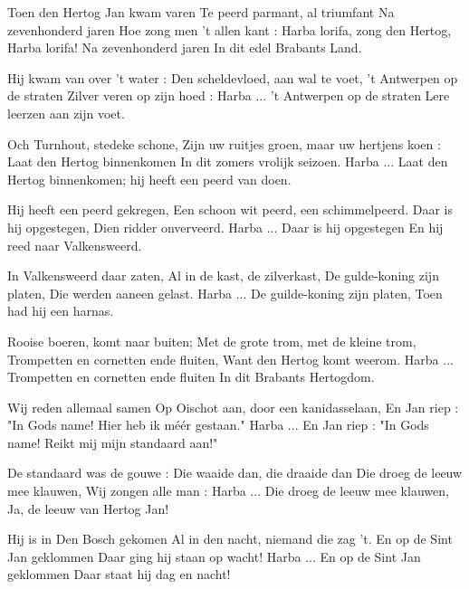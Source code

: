 \footnotemark [
ititle={Lied van Hertog Jan, het}]


\beginverse
Toen den Hertog Jan kwam varen
Te peerd parmant, al triumfant
Na zevenhonderd jaren
Hoe zong men 't allen kant :
Harba lorifa, zong den Hertog,
Harba lorifa!
Na zevenhonderd jaren
In dit edel Brabants Land.
\endverse

\beginverse
Hij kwam van over 't water :
Den scheldevloed, aan wal te voet,
't Antwerpen op de straten
Zilver veren op zijn hoed :
Harba ...
't Antwerpen op de straten
Lere leerzen aan zijn voet.
\endverse

\beginverse
Och Turnhout, stedeke schone,
Zijn uw ruitjes groen, maar uw hertjens koen :
Laat den Hertog binnenkomen
In dit zomers vrolijk seizoen.
Harba ...
Laat den Hertog binnenkomen;
hij heeft een peerd van doen.
\endverse

\beginverse
Hij heeft een peerd gekregen,
Een schoon wit peerd, een schimmelpeerd.
Daar is hij opgestegen,
Dien ridder onverveerd.
Harba ...
Daar is hij opgestegen
En hij reed naar Valkensweerd.
\endverse

\beginverse
In Valkensweerd daar zaten,
Al in de kast, de zilverkast,
De gulde-koning zijn platen,
Die werden aaneen gelast.
Harba ...
De guilde-koning zijn platen,
Toen had hij een harnas.
\endverse

\beginverse
Rooise boeren, komt naar buiten;
Met de grote trom, met de kleine trom,
Trompetten en cornetten ende fluiten,
Want den Hertog komt weerom.
Harba ...
Trompetten en cornetten ende fluiten
In dit Brabants Hertogdom.
\endverse

\beginverse
Wij reden allemaal samen
Op Oischot aan, door een kanidasselaan,
En Jan riep : "In Gods name!
Hier heb ik méér gestaan."
Harba ...
En Jan riep : "In Gods name!
Reikt mij mijn standaard aan!"
\endverse

\beginverse
De standaard was de gouwe :
Die waaide dan, die draaide dan
Die droeg de leeuw mee klauwen,
Wij zongen alle man :
Harba ...
Die droeg de leeuw mee klauwen,
Ja, de leeuw van Hertog Jan!
\endverse

\beginverse
Hij is in Den Bosch gekomen
Al in den nacht, niemand die zag 't.
En op de Sint Jan geklommen
Daar ging hij staan op wacht!
Harba ...
En op de Sint Jan geklommen
Daar staat hij dag en nacht!
\endverse
\endsong